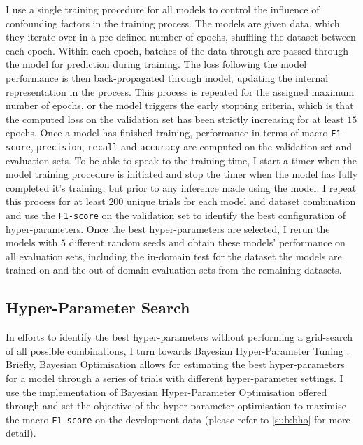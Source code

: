 I use a single training procedure for all models to control the influence of confounding factors in the training process.
The models are given data, which they iterate over in a pre-defined number of epochs, shuffling the dataset between each epoch. Within each epoch, batches of the data through are passed through the model for prediction during training.
The loss following the model performance is then back-propagated through model, updating the internal representation in the process.
This process is repeated for the assigned maximum number of epochs, or the model triggers the early stopping \citep{Early-stopping paper here} criteria, which is that the computed loss on the validation set has been strictly increasing for at least $15$ epochs.
Once a model has finished training, performance in terms of macro \texttt{F1-score}, \texttt{precision}, \texttt{recall} and \texttt{accuracy} are computed on the validation set and evaluation sets.
To be able to speak to the training time, I start a timer when the model training procedure is initiated and stop the timer when the model has fully completed it's training, but prior to any inference made using the model.
I repeat this process for at least $200$ unique trials for each model and dataset combination and use the \texttt{F1-score} on the validation set to identify the best configuration of hyper-parameters.
Once the best hyper-parameters are selected, I rerun the models with $5$ different random seeds and obtain these models' performance on all evaluation sets, including the in-domain test for the dataset the models are trained on and the out-of-domain evaluation sets from the remaining datasets.

\subsection{Hyper-Parameter Search}\label{sub:liwc_hyperparam}

In efforts to identify the best hyper-parameters without performing a grid-search of all possible combinations, I turn towards Bayesian Hyper-Parameter Tuning \citep{Neal:1996}. Briefly, Bayesian Optimisation allows for estimating the best hyper-parameters for a model through a series of trials with different hyper-parameter settings. I use the implementation of Bayesian Hyper-Parameter Optimisation offered through \citet{Wandb} and set the objective of the hyper-parameter optimisation to maximise the macro \texttt{F1-score} on the development data (please refer to \cref{sub:bho} for more detail).

